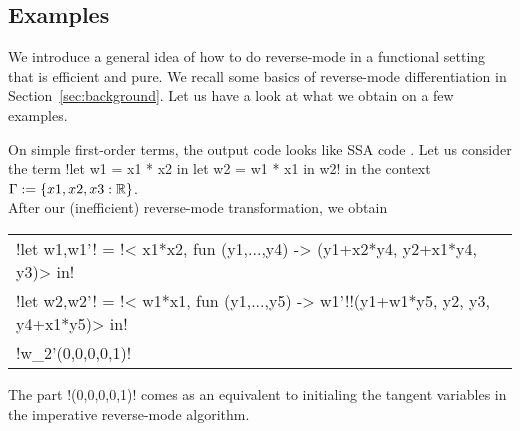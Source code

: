 \subsection{Examples}

We introduce a general idea of how to do reverse-mode in a functional setting that is efficient and pure.
We recall some basics of reverse-mode differentiation in Section~\ref{sec:background}.
Let us have a look at what we obtain on a few examples.

\begin{example}
On simple first-order terms, the output code looks like SSA code \cite{cytron1989efficient}.
Let us consider  the term !let w1 = x1 * x2 in let w2 = w1 * x1 in w2! in the context $\Gamma:=\{x1,x2,x3:\mathbb{R}\}$.\\
After our (inefficient) reverse-mode transformation, we obtain
\begin{center}
    \begin{tabular}{l}
        !let w1,w1'! = !< x1*x2, fun (y1,...,y4) -> (y1+x2*y4, y2+x1*y4, y3)> in!\\
        !let w2,w2'! = !< w1*x1, fun (y1,...,y5) -> w1'!!(y1+w1*y5, y2, y3, y4+x1*y5)> in!\\
        !w_2'(0,0,0,0,1)!
    \end{tabular}
\end{center}
The part !(0,0,0,0,1)! comes as an equivalent to initialing the tangent variables in the imperative reverse-mode algorithm. 


\end{example}
